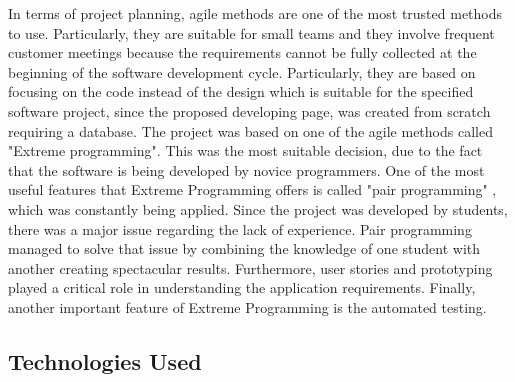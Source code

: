 \documentclass{l3proj}
\begin{document}
In terms of project planning, agile methods are one of the most trusted methods to use. Particularly, they are suitable for small teams and they involve frequent customer meetings because the requirements cannot be fully collected at the beginning of the software development cycle. Particularly, they are based on focusing on the code instead of the design which is suitable for the specified software project, since the proposed developing page, was created from scratch requiring a database. The project was based on one of the agile methods called "Extreme programming". This was the most suitable decision, due to the fact that the software is being developed by novice programmers. One of the most useful features that Extreme Programming offers is called "pair programming" , which was constantly being applied. Since the project was developed by students, there was a major issue regarding the lack of experience. Pair programming managed to solve that issue by combining the knowledge of one student with another creating spectacular results. Furthermore, user stories and prototyping played a critical role in understanding the application requirements. Finally, another important feature of Extreme Programming is the automated testing.

\subsection{Technologies Used}
\label{tech}
\end{document}
